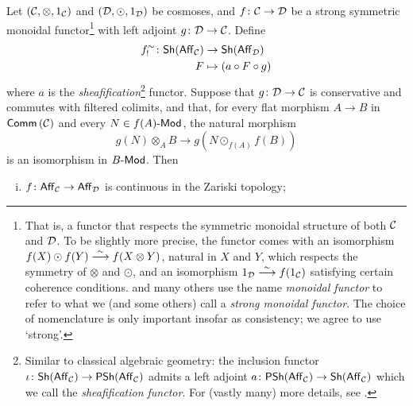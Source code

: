     \begin{theorem}\label{co:that-base-change-lemma-that-is-important}
        Let $(\mathcal{C},\otimes,1_{\mathcal{C}})$ and $(\mathcal{D},\odot,1_{\mathcal{D}})$ be cosmoses, and $f\colon\mathcal{C}\to\mathcal{D}$ be a strong symmetric monoidal functor\footnote{
            That is, a functor that respects the symmetric monoidal structure of both $\mathcal{C}$ and $\mathcal{D}$.
            To be slightly more precise, the functor comes with an isomorphism $f(X)\odot f(Y)\overset{\sim}{\longrightarrow} f(X\otimes Y)$, natural in $X$ and $Y$, which respects the symmetry of $\otimes$ and $\odot$, and an isomorphism \mbox{$1_{\mathcal{D}}\overset{\sim}{\longrightarrow} f(1_{\mathcal{C}})$} satisfying certain coherence conditions.
            \cite{Toen:2005wxa} and many others use the name \emph{monoidal functor} to refer to what we (and some others) call a \emph{strong monoidal functor}.
            The choice of nomenclature is only important insofar as consistency; we agree to use `strong'.
        } with left adjoint $g\colon\mathcal{D}\to\mathcal{C}$.
        Define
        \begin{align*}
            f_!^\sim\colon\mathsf{Sh}(\mathsf{Aff}_{\mathcal{C}})&\to\mathsf{Sh}(\mathsf{Aff}_{\mathcal{D}})\\
            F&\mapsto(a\circ F\circ g)
        \end{align*}
        where $a$ is the \emph{sheafification}\footnote{
            Similar to classical algebraic geometry: the inclusion functor $\iota\colon\mathsf{Sh}(\mathsf{Aff}_{\mathcal{C}})\to\mathsf{PSh}(\mathsf{Aff}_{\mathcal{C}})$ admits a left adjoint $a\colon\mathsf{PSh}(\mathsf{Aff}_{\mathcal{C}})\to\mathsf{Sh}(\mathsf{Aff}_{\mathcal{C}})$ which we call the \emph{sheafification functor}.
            For (vastly many) more details, see \cite[\S III.5,~Theorem~1]{MacLane:1992uz}.
        } functor.
        Suppose that $g\colon\mathcal{D}\to\mathcal{C}$ is conservative and commutes with filtered colimits, and that, for every flat morphism $A\to B$ in $\mathsf{Comm}\left({\mathcal{C}}\right)$ and every $N\in {{f(A)}\hbox{-}\mathsf{Mod}}$, the natural morphism
        \begin{equation*}
            g(N)\otimes_A B\to g(N\odot_{f(A)}f(B))
        \end{equation*}
        is an isomorphism in ${{B}\hbox{-}\mathsf{Mod}}$.
        Then
        \begin{enumerate}[(i)]
            \item $f\colon\mathsf{Aff}_{\mathcal{C}}\to\mathsf{Aff}_{\mathcal{D}}$ is continuous in the Zariski topology;

\end{enumerate}
\end{theorem}
